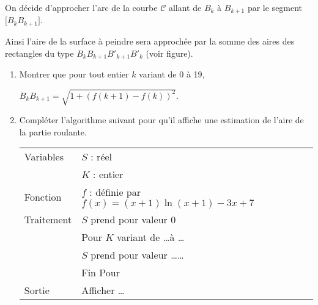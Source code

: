 \documentclass[12pt,a4paper,french]{article}
\theoremstyle{break}
\theoremstyle{plain}
\theoremstyle{nonumberplain}
\theoremstyle{nonumberbreak}
\begin{document}
\begin{question}
\begin{enumerate}
\medskip

On décide d'approcher l'arc de la courbe $\mathcal{C}$
allant de $B_k$ à $B_{k+1}$ par le segment $\biggl[B_kB_{k+1}\biggr]$.

Ainsi l'aire de la surface à peindre sera  approchée par la somme des aires des
rectangles du type $B_k B_{k+1} B'_{k+1}B'_k$ (voir figure).
	\begin{enumerate}
		\item Montrer que pour tout entier $k$ variant de 0 à 19, 
		
		$B_kB_{k+1} = \displaystyle\sqrt{1 + \left (f(k + 1) - f(k)\right )^2}$.
		\item Compléter l'algorithme suivant pour qu'il affiche une estimation de l'aire de la partie roulante.
		
\begin{center}
\begin{tabularx}{0.9\linewidth}{|l|X|}\hline		
Variables 	&$S$ : réel\\
			&$K$ : entier\\
Fonction 	&$f$ : définie par $f(x) = (x + 1)\ln(x + 1)- 3x + 7$\\ \hline
Traitement	&$S$ prend pour valeur $0$\\
			&Pour $K$ variant de \ldots \:à\: \ldots\\
			&\hspace{1cm}$S$ prend pour valeur \:\ldots \ldots\\
			&Fin Pour\\ \hline
Sortie 		&Afficher \ldots\\ \hline
\end{tabularx}
\end{center}
	\end{enumerate}
\end{enumerate}

\end{question}
\end{document}
